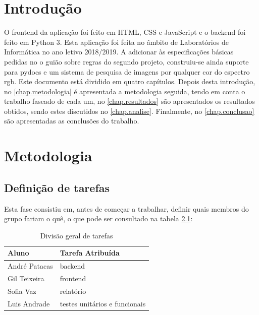 \documentclass{report}
\begin{document}

\tableofcontents
 \listoftables     %
 \listoffigures    %


\clearpage
{}

\chapter{Introdução}
\label{chap.introducao}

O frontend da aplicação foi feito em \ac{HTML}, \ac{CSS} e JavaScript e o backend foi feito em Python 3. Esta aplicação foi feita no âmbito de Laboratórios de Informática no ano letivo 2018/2019.
A adicionar às especificações básicas pedidas no o guião sobre regras do segundo projeto, construiu-se ainda suporte para pydocs e um sistema de pesquisa de imagens por qualquer cor do espectro rgb.
Este documento está dividido em quatro capítulos.
Depois desta introdução,
no \autoref{chap.metodologia} é apresentada a metodologia seguida, tendo em conta o trabalho faseado de cada um, 
no \autoref{chap.resultados} são apresentados os resultados obtidos,
sendo estes discutidos no \autoref{chap.analise}.
Finalmente, no \autoref{chap.conclusao} são apresentadas
as conclusões do trabalho.

\chapter{Metodologia}
\label{chap.metodologia}
\section{Definição de tarefas}
Esta fase consistiu em, antes de começar a trabalhar, definir quais membros do grupo fariam o quê, o que pode ser consultado na tabela \ref{tab:table1}: 
\begin{table}[h!]
\begin{center}
\caption{Divisão geral de tarefas}
\begin{tabular}{l|l}
\hline
\multicolumn{1}{|l|}{Aluno} & \multicolumn{1}{l|}{Tarefa Atribuída} \\ \hline
            André Patacas   & backend                               \\ 
            Gil Teixeira      & frontend                               \\
            Sofia Vaz         & relatório                                \\
            Luis Andrade    & testes unitários e funcionais                     
\end{tabular}
\label{tab:table1}
\end{center}
\end{table}
\end{document}

